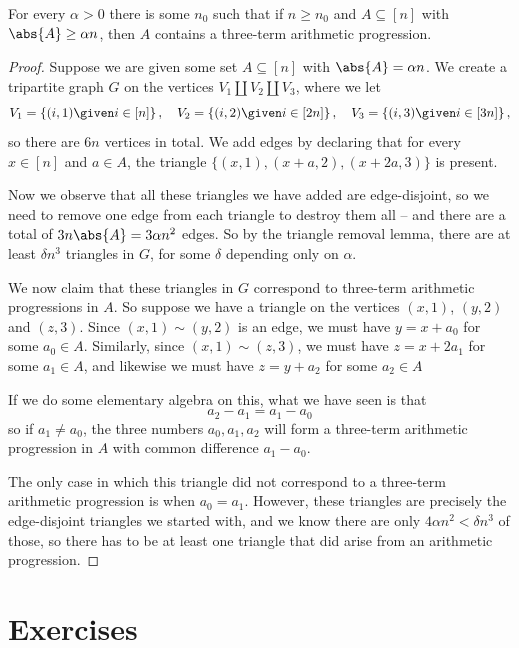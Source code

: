 \documentclass[nobib]{tufte-handout}
\begin{document}
\begin{theorem}[Roth, 1953]
    For every $\alpha > 0$ there is some $n_0$ such that if $n \geq n_0$ and $A \subseteq [n]$ with $\abs{A} \geq \alpha n$, then $A$ contains a three-term arithmetic progression.

    \begin{proof}
        Suppose we are given some set $A \subseteq [n]$ with $\abs{A} = \alpha n$. We create a tripartite graph $G$ on the vertices $V_1 \coprod V_2 \coprod V_3$, where we let
        $$V_1 = \left\{(i, 1) \given i \in [n]\right\}, \quad V_2 = \left\{(i, 2) \given i \in [2n]\right\}, \quad V_3 = \left\{(i, 3) \given i \in [3n]\right\},$$
        so there are $6n$ vertices in total. We add edges by declaring that for every $x \in [n]$ and $a\in A$, the triangle $\{(x,1), (x + a, 2), (x + 2a, 3)\}$ is present.

        Now we observe that all these triangles we have added are edge-disjoint, so we need to remove one edge from each triangle to destroy them all -- and there are a total of $3n\abs{A} = 3\alpha n^2$ edges. So by the triangle removal lemma, there are at least $\delta n^3$ triangles in $G$, for some $\delta$ depending only on $\alpha$.

        We now claim that these triangles in $G$ correspond to three-term arithmetic progressions in $A$. So suppose we have a triangle on the vertices $(x,1)$, $(y,2)$ and $(z,3)$. Since $(x,1) \sim (y,2)$ is an edge, we must have $y = x + a_0$ for some $a_0 \in A$. Similarly, since $(x,1) \sim (z,3)$, we must have $z = x + 2a_1$ for some $a_1 \in A$, and likewise we must have $z = y + a_2$ for some $a_2 \in A$

        If we do some elementary algebra on this, what we have seen is that
        $$a_2 - a_1 = a_1 - a_0$$
        so if $a_1 \neq a_0$, the three numbers $a_0, a_1, a_2$ will form a three-term arithmetic progression in $A$ with common difference $a_1 - a_0$.

        The only case in which this triangle did not correspond to a three-term arithmetic progression is when $a_0 = a_1$. However, these triangles are precisely the edge-disjoint triangles we started with, and we know there are only $4\alpha n^2 < \delta n^3$ of those, so there has to be at least one triangle that did arise from an arithmetic progression.
    \end{proof}
\end{theorem}

\section{Exercises}


%
%
\end{document}
